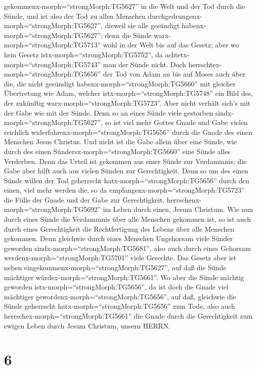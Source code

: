 gekommenx-morph=``strongMorph:TG5627'' in die Welt und der Tod durch die
Sünde, und ist also der Tod zu allen Menschen
durchgedrungenx-morph=``strongMorph:TG5627'', dieweil sie alle gesündigt
habenx-morph=``strongMorph:TG5627'';  denn die Sünde
warx-morph=``strongMorph:TG5713'' wohl in der Welt bis auf das Gesetz;
aber wo kein Gesetz istx-morph=``strongMorph:TG5752'', da
achtetx-morph=``strongMorph:TG5743'' man der Sünde nicht. 
Doch herrschtex-morph=``strongMorph:TG5656'' der Tod von Adam an bis auf
Moses auch über die, die nicht gesündigt
habenx-morph=``strongMorph:TG5660'' mit gleicher Übertretung wie Adam,
welcher istx-morph=``strongMorph:TG5748'' ein Bild des, der zukünftig
warx-morph=``strongMorph:TG5723''.  Aber nicht verhält
sich's mit der Gabe wie mit der Sünde. Denn so an eines Sünde viele
gestorben sindx-morph=``strongMorph:TG5627'', so ist viel mehr Gottes
Gnade und Gabe vielen reichlich
widerfahrenx-morph=``strongMorph:TG5656'' durch die Gnade des einen
Menschen Jesus Christus.  Und nicht ist die Gabe allein
über eine Sünde, wie durch des einen
Sündersx-morph=``strongMorph:TG5660'' eine Sünde alles Verderben. Denn
das Urteil ist gekommen aus einer Sünde zur Verdammnis; die Gabe aber
hilft auch aus vielen Sünden zur Gerechtigkeit.  Denn so um
des einen Sünde willen der Tod geherrscht
hatx-morph=``strongMorph:TG5656'' durch den einen, viel mehr werden die,
so da empfangenx-morph=``strongMorph:TG5723'' die Fülle der Gnade und
der Gabe zur Gerechtigkeit, herrschenx-morph=``strongMorph:TG5692'' im
Leben durch einen, Jesum Christum.  Wie nun durch eines
Sünde die Verdammnis über alle Menschen gekommen ist, so ist auch durch
eines Gerechtigkeit die Rechtfertigung des Lebens über alle Menschen
gekommen.  Denn gleichwie durch eines Menschen Ungehorsam
viele Sünder geworden sindx-morph=``strongMorph:TG5681'', also auch
durch eines Gehorsam werdenx-morph=``strongMorph:TG5701'' viele
Gerechte.  Das Gesetz aber ist neben
eingekommenx-morph=``strongMorph:TG5627'', auf daß die Sünde mächtiger
würdex-morph=``strongMorph:TG5661''. Wo aber die Sünde mächtig geworden
istx-morph=``strongMorph:TG5656'', da ist doch die Gnade viel mächtiger
gewordenx-morph=``strongMorph:TG5656'',  auf daß, gleichwie
die Sünde geherrscht hatx-morph=``strongMorph:TG5656'' zum Tode, also
auch herrschex-morph=``strongMorph:TG5661'' die Gnade durch die
Gerechtigkeit zum ewigen Leben durch Jesum Christum, unsern HERRN.

\hypertarget{section-5}{%
\section{6}\label{section-5}}


